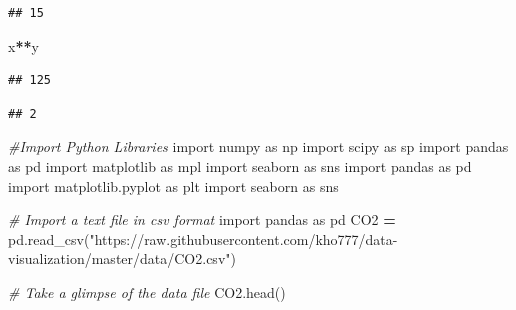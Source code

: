 \documentclass[]{book}
\newenvironment{Shaded}{\begin{snugshade}}{\end{snugshade}}
\newcommand{\CommentTok}[1]{\textcolor[rgb]{0.56,0.35,0.01}{\textit{#1}}}
\newcommand{\ImportTok}[1]{#1}
\newcommand{\NormalTok}[1]{#1}
\newcommand{\OperatorTok}[1]{\textcolor[rgb]{0.81,0.36,0.00}{\textbf{#1}}}
\newcommand{\StringTok}[1]{\textcolor[rgb]{0.31,0.60,0.02}{#1}}
\begin{document}
\begin{verbatim}
## 15
\end{verbatim}

\begin{Shaded}
\begin{Highlighting}[]
\NormalTok{x}\OperatorTok{**}\NormalTok{y}
\end{Highlighting}
\end{Shaded}

\begin{verbatim}
## 125
\end{verbatim}

\begin{Shaded}
\end{Shaded}

\begin{verbatim}
## 2
\end{verbatim}

\begin{Shaded}
\begin{Highlighting}[]
\CommentTok{#Import Python Libraries}
\ImportTok{import}\NormalTok{ numpy }\ImportTok{as}\NormalTok{ np}
\ImportTok{import}\NormalTok{ scipy }\ImportTok{as}\NormalTok{ sp}
\ImportTok{import}\NormalTok{ pandas }\ImportTok{as}\NormalTok{ pd}
\ImportTok{import}\NormalTok{ matplotlib }\ImportTok{as}\NormalTok{ mpl}
\ImportTok{import}\NormalTok{ seaborn }\ImportTok{as}\NormalTok{ sns}
\ImportTok{import}\NormalTok{ pandas }\ImportTok{as}\NormalTok{ pd}
\ImportTok{import}\NormalTok{ matplotlib.pyplot }\ImportTok{as}\NormalTok{ plt}
\ImportTok{import}\NormalTok{ seaborn }\ImportTok{as}\NormalTok{ sns}
\end{Highlighting}
\end{Shaded}

\begin{Shaded}
\begin{Highlighting}[]

\CommentTok{# Import a text file in csv format}
\ImportTok{import}\NormalTok{ pandas }\ImportTok{as}\NormalTok{ pd}
\NormalTok{CO2 }\OperatorTok{=}\NormalTok{ pd.read_csv(}\StringTok{"https://raw.githubusercontent.com/kho777/data-visualization/master/data/CO2.csv"}\NormalTok{)}

\CommentTok{# Take a glimpse of the data file}
\NormalTok{CO2.head()}
\end{Highlighting}
\end{Shaded}
\end{document}
